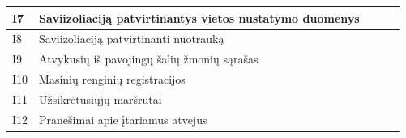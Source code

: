 \documentclass{VUMIFPSkursinis}
\begin{document}
\begin{table}[]
{\begin{tabular}{|l|l|l|l|l|}
			I7                  & Saviizoliaciją patvirtinantys vietos nustatymo duomenys     &                                                     &                                                 &                                                \\ \hline
			I8                  & Saviizoliaciją patvirtinanti nuotrauką                      &                                                     &                                                 &                                                \\ \hline
			I9                  & Atvykusių iš pavojingų šalių žmonių sąrašas                 &                                                     &                                                 &                                                \\ \hline
			I10                 & Masinių renginių registracijos                              &                                                     &                                                 &                                                \\ \hline
			I11                 & Užsikrėtusiųjų maršrutai                                    &                                                     &                                                 &                                                \\ \hline
			I12                 & Pranešimai apie įtariamus atvejus                           &                                                     &                                                 &                                                \\ \hline
		\end{tabular}%
	}
\end{table}
\end{document}
